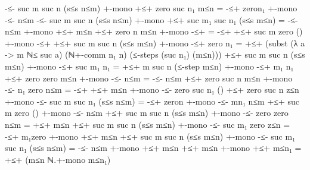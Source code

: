 \documentclass[11pt,a4paper]{article}
\begin{document}
\begin{code}
-≤- {suc m} {suc n} (s≤s n≤m) +-mono +≤+ {zero} {suc n₁} m≤n =
  -≤+ {zero}{n₁} +-mono -≤- n≤m
-≤- {suc m} {suc n} (s≤s n≤m) +-mono +≤+ {suc m₁} {suc n₁} (s≤s m≤n) =
  -≤- n≤m +-mono +≤+ m≤n
+≤+ {zero} {n} m≤n +-mono -≤+ = -≤+
+≤+ {suc m} {zero} () +-mono -≤+
+≤+ {suc m} {suc n} (s≤s m≤n) +-mono -≤+ {zero} {n₁} =
  +≤+ (subst (λ a -> m ℕ≤ suc a) (ℕ+-comm n₁ n) (≤-steps (suc n₁) (m≤n)))
+≤+ {suc m} {suc n} (s≤s m≤n) +-mono -≤+ {suc m₁} {n₁} =
  +≤+ {m} {suc n} (≤-step m≤n) +-mono -≤+ {m₁} {n₁}
+≤+ {zero} {zero} m≤n +-mono -≤- n≤m = -≤- n≤m
+≤+ {zero} {suc n} m≤n +-mono -≤- {n₁} {zero} n≤m = -≤+
+≤+ m≤n +-mono -≤- {zero} {suc n₁} ()
+≤+ {zero} {suc n} z≤n +-mono -≤- {suc m} {suc n₁} (s≤s n≤m) =
  -≤+ {zero}{n} +-mono -≤- {m}{n₁} n≤m
+≤+ {suc m} {zero} () +-mono -≤- n≤m
+≤+ {suc m} {suc n} (s≤s m≤n) +-mono -≤- {zero} {zero} n≤m = +≤+ m≤n
+≤+ {suc m} {suc n} (s≤s m≤n) +-mono -≤- {suc m₁} {zero} z≤n =
  -≤+ {m₁}{zero} +-mono +≤+ m≤n
+≤+ {suc m} {suc n} (s≤s m≤n) +-mono -≤- {suc m₁} {suc n₁} (s≤s n≤m) =
  -≤- n≤m +-mono +≤+ m≤n
+≤+ m≤n +-mono +≤+ m≤n₁ = +≤+ (m≤n ℕ.+-mono m≤n₁)
  \end{code}
\end{document}
